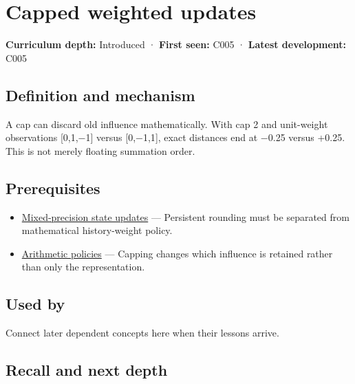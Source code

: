 \hypertarget{appendix-1e45d0613db3}{}\label{referencestart:appendix-1e45d0613db3}
\section{Capped weighted updates}\label{appendix-1e45d0613db3-capped-weighted-updates}

\textbf{Curriculum depth:} Introduced · \textbf{First seen:} C005 · \textbf{Latest development:} C005

\begin{allmightroledefinition}

\subsection{Definition and mechanism}\label{appendix-1e45d0613db3-definition-and-mechanism}

A cap can discard old influence mathematically. With cap 2 and unit-weight observations {[}0,1,−1{]} versus {[}0,−1,1{]}, exact distances end at −0.25 versus +0.25. This is not merely floating summation order.

\end{allmightroledefinition}

\subsection{Prerequisites}\label{appendix-1e45d0613db3-prerequisites}

\begin{itemize}
\tightlist
\item
  \hyperref[appendix-260182e617b7]{Mixed-precision state updates} --- Persistent rounding must be separated from mathematical history-weight policy.
\item
  \hyperref[appendix-2ed044358b82]{Arithmetic policies} --- Capping changes which influence is retained rather than only the representation.
\end{itemize}

\subsection{Used by}\label{appendix-1e45d0613db3-used-by}

Connect later dependent concepts here when their lessons arrive.

\subsection{Recall and next depth}\label{appendix-1e45d0613db3-recall-and-next-depth}

